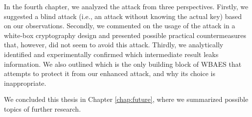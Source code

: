 In the fourth chapter, we analyzed the attack from three perspectives. Firstly, we suggested a blind attack (i.e., an attack without knowing the actual key) based on our observations. Secondly, we commented on the usage of the attack in a white-box cryptography design and presented possible practical countermeasures that, however, did not seem to avoid this attack. Thirdly, we analytically identified and experimentally confirmed which intermediate result leaks information. We also outlined which is the only building block of WBAES that attempts to protect it from our enhanced attack, and why its choice is inappropriate.

We concluded this thesis in Chapter \ref{chap:future}, where we summarized possible topics of further research.
